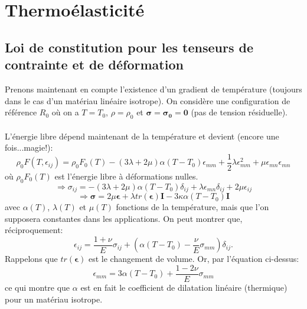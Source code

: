 \section{Thermoélasticité}
\subsection{Loi de constitution pour les tenseurs de contrainte et de déformation}
Prenons maintenant en compte l'existence d'un gradient de température (toujours dans le cas d'un matériau linéaire isotrope). On considère une configuration de référence $R_0$ où on a $T=T_0$, $\rho=\rho_0$ et $\boldsymbol{\sigma}=\boldsymbol{\sigma_0}=\mathbf{0}$ (pas de tension résiduelle). 
\paragraph{}
L'énergie libre dépend maintenant de la température et devient (encore une fois...magie!):
$$\rho_0F(T,\epsilon_{ij})=\rho_0F_0(T)-(3\lambda+2\mu)\alpha(T-T_0)\epsilon_{mm}+\frac{1}{2}\lambda\epsilon_{mm}^2+\mu\epsilon_{mn}\epsilon_{mn}$$
où $\rho_0F_0(T)$ est l'énergie libre à déformations nulles.
$$\Rightarrow\sigma_{ij}=-(3\lambda+2\mu)\alpha(T-T_0)\delta_{ij}+\lambda\epsilon_{mn}\delta_{ij}+2\mu\epsilon_{ij}$$
$$\Rightarrow\boxed{\boldsymbol{\sigma}=2\mu\boldsymbol{\epsilon}+\lambda tr(\boldsymbol{\epsilon})\textbf{I}-3\kappa\alpha(T-T_0)\textbf{I}}$$
avec $\alpha(T)$, $\lambda(T)$ et $\mu(T)$ fonctions de la température, mais que l'on supposera constantes dans les applications. On peut montrer que, réciproquement:
$$\epsilon_{ij}=\frac{1+\nu}{E}\sigma_{ij}+\left(\alpha(T-T_0)-\frac{\nu}{E}\sigma_{mm}\right)\delta_{ij}.$$ Rappelons que $tr(\boldsymbol{\epsilon})$ est le changement de volume. Or, par l'équation ci-dessus:
$$\epsilon_{mm}=3\alpha(T-T_0)+\frac{1-2\nu}{E}\sigma_{mm}$$ ce qui montre que $\alpha$ est en fait le coefficient de dilatation linéaire (thermique) pour un matériau isotrope.
